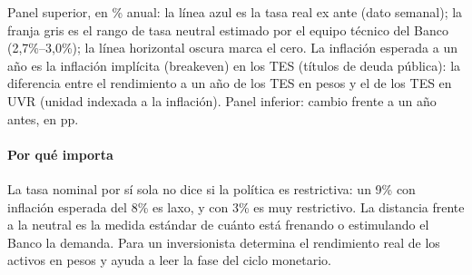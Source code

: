 \begin{leer}
Panel superior, en \% anual: la línea azul es la tasa real ex ante (dato semanal); la franja gris es el rango de tasa neutral estimado por el equipo técnico del Banco (2,7\%–3,0\%); la línea horizontal oscura marca el cero. La inflación esperada a un año es la inflación implícita (breakeven) en los TES (títulos de deuda pública): la diferencia entre el rendimiento a un año de los TES en pesos y el de los TES en UVR (unidad indexada a la inflación). Panel inferior: cambio frente a un año antes, en pp.
\end{leer}

\paragraph{Por qué importa}
La tasa nominal por sí sola no dice si la política es restrictiva: un 9\% con inflación esperada del 8\% es laxo, y con 3\% es muy restrictivo. La distancia frente a la neutral es la medida estándar de cuánto está frenando o estimulando el Banco la demanda. Para un inversionista determina el rendimiento real de los activos en pesos y ayuda a leer la fase del ciclo monetario.

